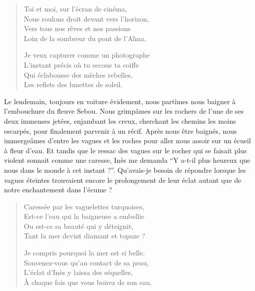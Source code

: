 \begin{verse}%
  \quatrain%
  Toi et moi, sur l’écran de cinéma,\\  %
  Nous roulons droit devant vers l’horizon,\\  %
  Vers tous nos rêves et nos passions\\  %
  Loin de la sombreur du pont de l’Alma.

  Je veux capturer comme un photographe\\  %
  L’instant précis où tu secoue ta coiffe\\  %
  Qui éclabousse des mèches rebelles,\\  %
  Les reflets des lunettes de soleil.
\end{verse}

\begin{prose}
  Le lendemain, toujours en voiture évidement, nous partîmes nous baigner à l’embouchure du fleuve Sebou. Nous grimpâmes  sur les rochers de l’une de ses deux immenses jetées, enjambant les creux, cherchant les chemins les moins escarpés, pour finalement parvenir à un récif. Après nous être baignés, nous immergeâmes d’entre les vagues et les roches pour aller nous assoir sur un écueil à fleur d’eau. Et tandis que le ressac des vagues sur le rocher qui se faisait plus violent sonnait comme une caresse, Inès me demanda \enquote{Y a-t-il plus heureux que nous dans le monde à cet instant ?}. Qu’avais-je besoin de  répondre lorsque les vagues éteintes trouvaient encore le prolongement de leur éclat autant que de notre enchantement dans l’écume ?
\end{prose}

\begin{verse}%
  \quatrain%
  Caressée par les vaguelettes turquoises,\\  %
  Est-ce l’eau qui la baigneuse a embellie\\  %
  Ou est-ce sa beauté qui y déteignit,\\  %
  Tant la mer devint diamant et topaze ?

  Je compris pourquoi la mer est si belle.\\  %
  Souvenez-vous qu’au contact de sa peau,\\  %
  L’éclat d’Inès y laissa des séquelles,\\  %
  À chaque fois que vous boirez de son eau.
\end{verse}

